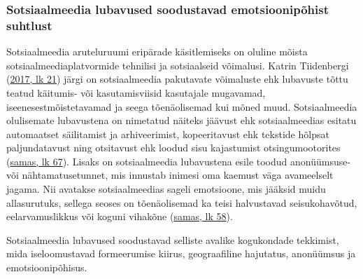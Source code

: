 \documentclass[estonian,]{article}
\begin{document}
\hypertarget{sotsiaalmeedia-lubavused-soodustavad-emotsioonipuxf5hist-suhtlust}{%
\subsubsection*{Sotsiaalmeedia lubavused soodustavad emotsioonipõhist suhtlust}\label{sotsiaalmeedia-lubavused-soodustavad-emotsioonipuxf5hist-suhtlust}}

Sotsiaalmeedia aruteluruumi eripärade käsitlemiseks on oluline mõista sotsiaalmeediaplatvormide tehnilisi ja sotsiaalseid võimalusi. Katrin Tiidenbergi (\protect\hyperlink{Tiidenberg2017}{2017, lk 21}) järgi on sotsiaalmeedia pakutavate võimaluste ehk lubavuste tõttu teatud käitumis- või kasutamisviisid kasutajale mugavamad, iseenesestmõistetavamad ja seega tõenäolisemad kui mõned muud. Sotsiaalmeedia olulisemate lubavustena on nimetatud näiteks jäävust ehk sotsiaalmeedias esitatu automaatset säilitamist ja arhiveerimist, kopeeritavust ehk tekstide hõlpsat paljundatavust ning otsitavust ehk loodud sisu kajastumist otsingumootorites (\protect\hyperlink{Tiidenberg2017}{samas, lk 67}). Lisaks on sotsiaalmeedia lubavustena esile toodud anonüümsuse- või nähtamatusetunnet, mis innustab inimesi oma kaemust väga avameelselt jagama. Nii avatakse sotsiaalmeedias sageli emotsioone, mis jääksid muidu allasurutuks, sellega seoses on tõenäolisemad ka teisi halvustavad seisukohavõtud, eelarvamuslikkus või koguni vihakõne (\protect\hyperlink{Tiidenberg2017}{samas, lk 58}).

\begin{blockquote-left}
Sotsiaalmeedia lubavused soodustavad selliste avalike kogukondade
tekkimist, mida iseloomustavad formeerumise kiirus, geograafiline
hajutatus, anonüümsus ja emotsioonipõhisus.
\end{blockquote-left}
\end{document}
